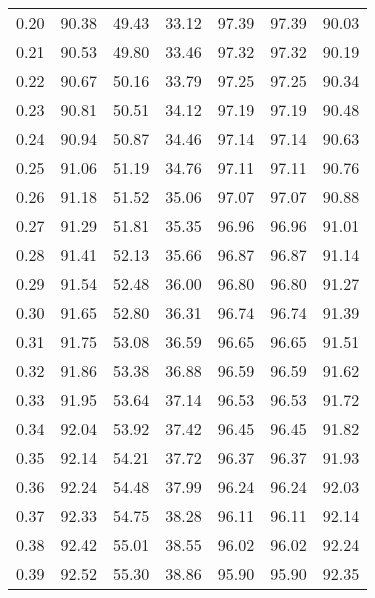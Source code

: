 \begin{tabular}{|c|c|c|c|c|c|c|}
      0.20 &     90.38 &     49.43 &      33.12 &   97.39 &      97.39 &         90.03 \\
      0.21 &     90.53 &     49.80 &      33.46 &   97.32 &      97.32 &         90.19 \\
      0.22 &     90.67 &     50.16 &      33.79 &   97.25 &      97.25 &         90.34 \\
      0.23 &     90.81 &     50.51 &      34.12 &   97.19 &      97.19 &         90.48 \\
      0.24 &     90.94 &     50.87 &      34.46 &   97.14 &      97.14 &         90.63 \\
      0.25 &     91.06 &     51.19 &      34.76 &   97.11 &      97.11 &         90.76 \\
      0.26 &     91.18 &     51.52 &      35.06 &   97.07 &      97.07 &         90.88 \\
      0.27 &     91.29 &     51.81 &      35.35 &   96.96 &      96.96 &         91.01 \\
      0.28 &     91.41 &     52.13 &      35.66 &   96.87 &      96.87 &         91.14 \\
      0.29 &     91.54 &     52.48 &      36.00 &   96.80 &      96.80 &         91.27 \\
      0.30 &     91.65 &     52.80 &      36.31 &   96.74 &      96.74 &         91.39 \\
      0.31 &     91.75 &     53.08 &      36.59 &   96.65 &      96.65 &         91.51 \\
      0.32 &     91.86 &     53.38 &      36.88 &   96.59 &      96.59 &         91.62 \\
      0.33 &     91.95 &     53.64 &      37.14 &   96.53 &      96.53 &         91.72 \\
      0.34 &     92.04 &     53.92 &      37.42 &   96.45 &      96.45 &         91.82 \\
      0.35 &     92.14 &     54.21 &      37.72 &   96.37 &      96.37 &         91.93 \\
      0.36 &     92.24 &     54.48 &      37.99 &   96.24 &      96.24 &         92.03 \\
      0.37 &     92.33 &     54.75 &      38.28 &   96.11 &      96.11 &         92.14 \\
      0.38 &     92.42 &     55.01 &      38.55 &   96.02 &      96.02 &         92.24 \\
      0.39 &     92.52 &     55.30 &      38.86 &   95.90 &      95.90 &         92.35 \\

\end{tabular}

